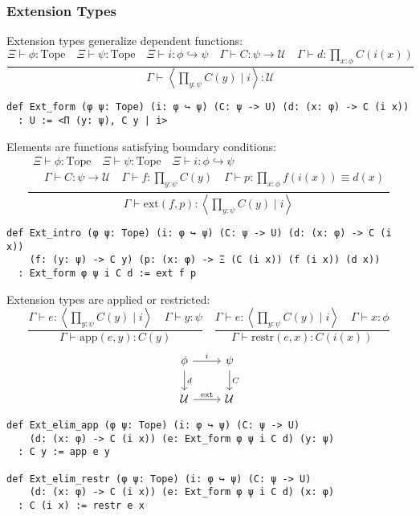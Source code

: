 \documentclass{article}
\begin{document}
\subsubsection{Extension Types}

\begin{definition}
Extension types generalize dependent functions:
\[
  \frac{\Xi \vdash \phi : \text{Tope} \quad \Xi \vdash \psi : \text{Tope} \quad \Xi \vdash i : \phi \hookrightarrow \psi \quad \Gamma \vdash C : \psi \to \mathcal{U} \quad \Gamma \vdash d : \prod_{x : \phi} C(i(x))}{\Gamma \vdash \left\langle \prod_{y : \psi} C(y) \mid i \right\rangle : \mathcal{U}}
\]
\begin{lstlisting}[mathescape=true]
def Ext_form (φ ψ: Tope) (i: φ ↪ ψ) (C: ψ -> U) (d: (x: φ) -> C (i x))
  : U := <Π (y: ψ), C y | i>
\end{lstlisting}
\end{definition}

\begin{definition}
Elements are functions satisfying boundary conditions:
\[
\frac{
  \begin{array}{l}
   \Xi \vdash \phi : \text{Tope} \quad \Xi \vdash \psi : \text{Tope} \quad \Xi \vdash i : \phi \hookrightarrow \psi \\[0.2cm]
   \quad \Gamma \vdash C : \psi \to \mathcal{U} \quad \Gamma \vdash f : \prod_{y : \psi} C(y) \quad \Gamma \vdash p : \prod_{x : \phi} f(i(x)) \equiv d(x)
  \end{array}
 }
 {
   \Gamma \vdash \text{ext}(f, p) : \left\langle \prod_{y : \psi} C(y) \mid i \right\rangle
 }
\]
\begin{lstlisting}[mathescape=true]
def Ext_intro (φ ψ: Tope) (i: φ ↪ ψ) (C: ψ -> U) (d: (x: φ) -> C (i x))
    (f: (y: ψ) -> C y) (p: (x: φ) -> Ξ (C (i x)) (f (i x)) (d x))
  : Ext_form φ ψ i C d := ext f p
\end{lstlisting}
\end{definition}

\begin{definition}
Extension types are applied or restricted:
\[
\frac{\Gamma \vdash e : \left\langle \prod_{y : \psi} C(y) \mid i \right\rangle \quad \Gamma \vdash y : \psi}{\Gamma \vdash \text{app}(e, y) : C(y)} \quad \frac{\Gamma \vdash e : \left\langle \prod_{y : \psi} C(y) \mid i \right\rangle \quad \Gamma \vdash x : \phi}{\Gamma \vdash \text{restr}(e, x) : C(i(x))}
\]
\[
\begin{tikzcd}
\phi \arrow[r, "i"] \arrow[d, "d"] & \psi \arrow[d, "C"] \\
\mathcal{U} \arrow[r, "\text{ext}"] & \mathcal{U}
\end{tikzcd}
\]
\begin{lstlisting}[mathescape=true]
def Ext_elim_app (φ ψ: Tope) (i: φ ↪ ψ) (C: ψ -> U)
    (d: (x: φ) -> C (i x)) (e: Ext_form φ ψ i C d) (y: ψ)
  : C y := app e y

def Ext_elim_restr (φ ψ: Tope) (i: φ ↪ ψ) (C: ψ -> U)
    (d: (x: φ) -> C (i x)) (e: Ext_form φ ψ i C d) (x: φ)
  : C (i x) := restr e x
\end{lstlisting}
\end{definition}
\end{document}
